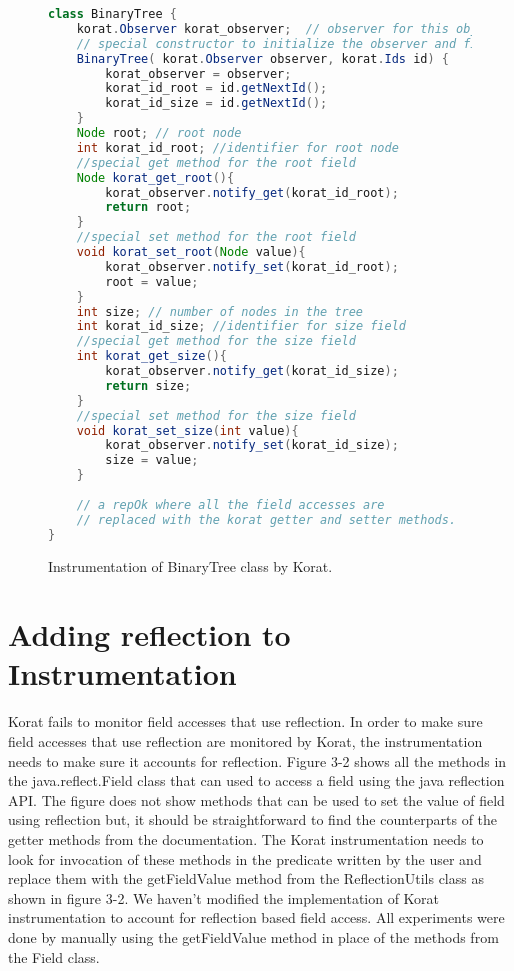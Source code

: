 \begin{figure}
\centering
\begin{lstlisting}[language=Java]
class BinaryTree {
    korat.Observer korat_observer;  // observer for this object
    // special constructor to initialize the observer and field ids
    BinaryTree( korat.Observer observer, korat.Ids id) {
        korat_observer = observer;
        korat_id_root = id.getNextId();
        korat_id_size = id.getNextId();
    }
    Node root; // root node
    int korat_id_root; //identifier for root node
    //special get method for the root field
    Node korat_get_root(){
        korat_observer.notify_get(korat_id_root);
        return root;
    }
    //special set method for the root field
    void korat_set_root(Node value){
        korat_observer.notify_set(korat_id_root);
        root = value;
    }
    int size; // number of nodes in the tree
    int korat_id_size; //identifier for size field
    //special get method for the size field
    int korat_get_size(){ 
        korat_observer.notify_get(korat_id_size);
        return size;
    }
    //special set method for the size field
    void korat_set_size(int value){ 
        korat_observer.notify_set(korat_id_size);
        size = value;
    }
   
    // a repOk where all the field accesses are 
    // replaced with the korat getter and setter methods.
}
\end{lstlisting}
\caption{Instrumentation of BinaryTree class by Korat.}
\label{fig:btTreeInstrumentationKorat}
\end{figure}


\section{Adding reflection to Instrumentation}
Korat fails to monitor field accesses that use reflection. In order to make sure field accesses that use reflection are monitored by Korat, the instrumentation needs to make sure it accounts for reflection. Figure 3-2 shows all the methods in the java.reflect.Field class that can used to access a field using the java reflection API. The figure does not show methods that can be used to set the value of field using reflection but, it should be straightforward to find the counterparts of the getter methods from the documentation. The Korat instrumentation needs to look for invocation of these methods in the predicate written by the user and replace them with the getFieldValue method from the ReflectionUtils class as shown in figure 3-2. We haven’t modified the implementation of Korat instrumentation to account for reflection based field access. All experiments were done by manually using the getFieldValue method in place of the methods from the Field class.

